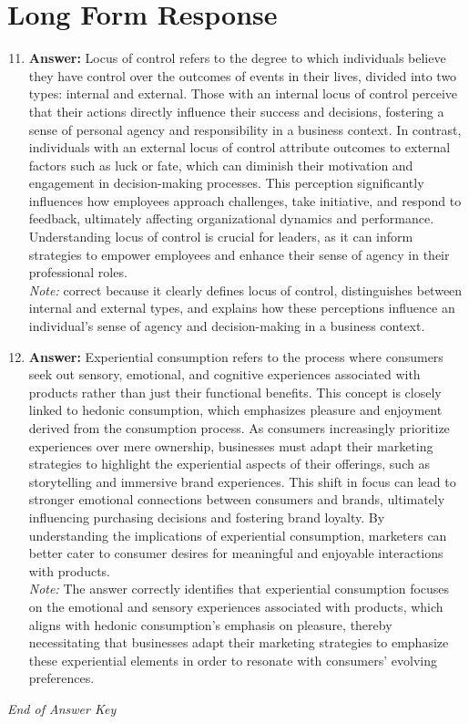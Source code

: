 \documentclass[12pt]{article}
\begin{document}
\section*{Long Form Response}
\begin{enumerate}[label=\arabic*.]
\setcounter{enumi}{10}
\item \textbf{Answer:} Locus of control refers to the degree to which individuals believe they have control over the outcomes of events in their lives, divided into two types: internal and external. Those with an internal locus of control perceive that their actions directly influence their success and decisions, fostering a sense of personal agency and responsibility in a business context. In contrast, individuals with an external locus of control attribute outcomes to external factors such as luck or fate, which can diminish their motivation and engagement in decision-making processes. This perception significantly influences how employees approach challenges, take initiative, and respond to feedback, ultimately affecting organizational dynamics and performance. Understanding locus of control is crucial for leaders, as it can inform strategies to empower employees and enhance their sense of agency in their professional roles.
\\ \textit{Note:} correct because it clearly defines locus of control, distinguishes between internal and external types, and explains how these perceptions influence an individual's sense of agency and decision-making in a business context.
\item \textbf{Answer:} Experiential consumption refers to the process where consumers seek out sensory, emotional, and cognitive experiences associated with products rather than just their functional benefits. This concept is closely linked to hedonic consumption, which emphasizes pleasure and enjoyment derived from the consumption process. As consumers increasingly prioritize experiences over mere ownership, businesses must adapt their marketing strategies to highlight the experiential aspects of their offerings, such as storytelling and immersive brand experiences. This shift in focus can lead to stronger emotional connections between consumers and brands, ultimately influencing purchasing decisions and fostering brand loyalty. By understanding the implications of experiential consumption, marketers can better cater to consumer desires for meaningful and enjoyable interactions with products.
\\ \textit{Note:} The answer correctly identifies that experiential consumption focuses on the emotional and sensory experiences associated with products, which aligns with hedonic consumption's emphasis on pleasure, thereby necessitating that businesses adapt their marketing strategies to emphasize these experiential elements in order to resonate with consumers' evolving preferences.
\end{enumerate}

\vfill
\noindent\textit{End of Answer Key}
\end{document}
